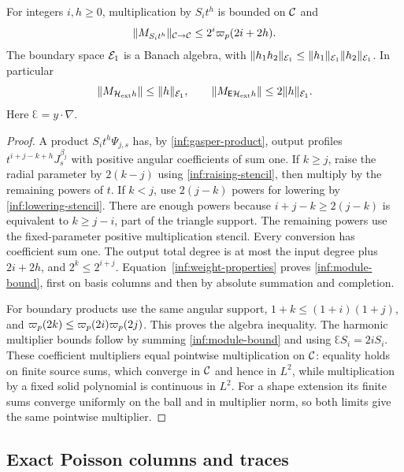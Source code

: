 \begin{proposition}
\label{inf:module}
For integers $i,h\ge0$, multiplication by $S_it^h$ is bounded on $\mathcal C$ and
\begin{equation}\label{inf:module-bound}
 \lVert M_{S_it^h}\rVert_{\mathcal C\to\mathcal C}\le2^i\varpi_p(2i+2h).
\end{equation}
The boundary space $\mathcal E_1$ is a Banach algebra, with
$\lVert h_1h_2\rVert_{\mathcal E_1}\le\lVert h_1\rVert_{\mathcal E_1}\lVert h_2\rVert_{\mathcal E_1}$.
In particular
\begin{equation}\label{inf:harmonic-module}
 \lVert M_{\mathcal H_{\mathrm{ext}} h}\rVert\le\lVert h\rVert_{\mathcal E_1},\qquad
 \lVert M_{\mathsf E\mathcal H_{\mathrm{ext}} h}\rVert\le2\lVert h\rVert_{\mathcal E_1}.
\end{equation}
Here $\Euler=y\cdot\nabla$.
\end{proposition}
\begin{proof}
A product $S_it^h\Psi_{j,s}$ has, by
\eqref{inf:gasper-product}, output profiles
$t^{i+j-k+h}J_s^{\beta_j}$ with positive angular coefficients of
sum one. If $k\ge j$, raise the radial parameter by $2(k-j)$
using \eqref{inf:raising-stencil}, then multiply by the remaining
powers of $t$. If $k<j$, use $2(j-k)$ powers for lowering by
\eqref{inf:lowering-stencil}. There are enough powers because
$i+j-k\ge2(j-k)$ is equivalent to $k\ge j-i$, part of the
triangle support. The remaining powers use the fixed-parameter
positive multiplication stencil.
Every conversion has coefficient sum one. The output total degree
is at most the input degree plus $2i+2h$, and $2^k\le2^{i+j}$.
Equation~\eqref{inf:weight-properties} proves
\eqref{inf:module-bound}, first on basis columns and then by
absolute summation and completion.

For boundary products use the same angular support,
$1+k\le(1+i)(1+j)$, and
$\varpi_p(2k)\le\varpi_p(2i)\varpi_p(2j)$.
This proves the algebra inequality. The harmonic multiplier
bounds follow by summing \eqref{inf:module-bound} and using
$\Euler S_i=2iS_i$.
These coefficient multipliers equal pointwise multiplication
on $\mathcal C$: equality holds on finite source sums, which converge
in $\mathcal C$ and hence in $L^2$, while multiplication by a fixed
solid polynomial is continuous in $L^2$.
For a shape extension its finite sums converge uniformly on
the ball and in multiplier norm, so both limits give the same
pointwise multiplier.
\end{proof}

\subsection{Exact Poisson columns and traces}


